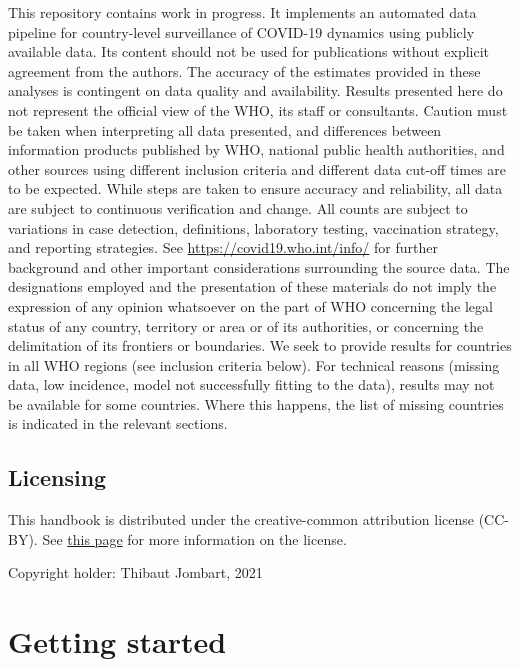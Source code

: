 \documentclass[]{book}
\begin{document}
This repository contains work in progress. It implements an automated data pipeline for country-level surveillance of COVID-19 dynamics using publicly available data. Its content should not be used for publications without explicit agreement from the authors. The accuracy of the estimates provided in these analyses is contingent on data quality and availability. Results presented here do not represent the official view of the WHO, its staff or consultants. Caution must be taken when interpreting all data presented, and differences between information products published by WHO, national public health authorities, and other sources using different inclusion criteria and different data cut-off times are to be expected. While steps are taken to ensure accuracy and reliability, all data are subject to continuous verification and change. All counts are subject to variations in case detection, definitions, laboratory testing, vaccination strategy, and reporting strategies. See \url{https://covid19.who.int/info/} for further background and other important considerations surrounding the source data. The designations employed and the presentation of these materials do not imply the expression of any opinion whatsoever on the part of WHO concerning the legal status of any country, territory or area or of its authorities, or concerning the delimitation of its frontiers or boundaries. We seek to provide results for countries in all WHO regions (see inclusion criteria below). For technical reasons (missing data, low incidence, model not successfully fitting to the data), results may not be available for some countries. Where this happens, the list of missing countries is indicated in the relevant sections.

\hypertarget{licensing}{%
\section{Licensing}\label{licensing}}

This handbook is distributed under the creative-common attribution license
(CC-BY). See \href{https://creativecommons.org/licenses/by/2.0/}{this page} for more
information on the license.

Copyright holder: Thibaut Jombart, 2021

\hypertarget{getting-started}{%
\chapter{Getting started}\label{getting-started}}
\end{document}
